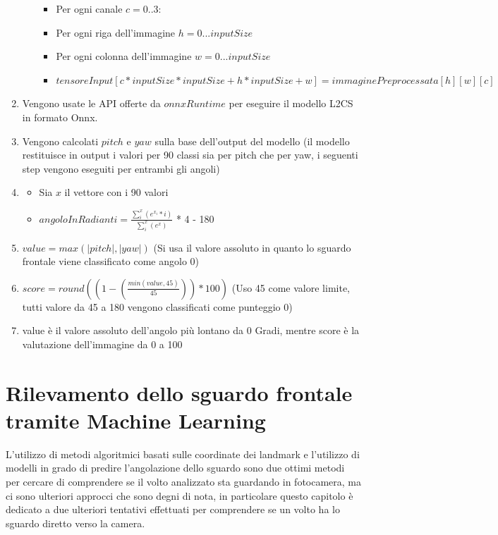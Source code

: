 \documentclass[12pt,a4paper,openright,twoside]{book}
\begin{document}
\begin{enumerate}
\begin{itemize}
\begin{itemize}
            \item Per ogni canale \(c = 0..3\): 
            \item Per ogni riga dell'immagine \(h = 0...inputSize\) 
            \item Per ogni colonna dell'immagine \(w = 0...inputSize\) 
            \item \(tensoreInput[c * inputSize * inputSize + h * inputSize + w] = immaginePreprocessata[h][w][c]\)
        \end{itemize}
    \end{itemize}
    \item Vengono usate le API offerte da \(onnxRuntime\) per eseguire il modello L2CS in formato Onnx. 
    \item Vengono calcolati \(pitch\) e \(yaw\) sulla base dell'output del modello (il modello restituisce in output i valori per 90 classi sia per pitch che per yaw, i seguenti step vengono eseguiti per entrambi gli angoli) 
    \item \begin{itemize} 
        \item Sia \(x\) il vettore con i 90 valori
        \item \(angoloInRadianti = \frac{\sum_{i}^{x} (e^{x_i}*i)}{\sum_i^{x}(e^x)}\) * 4 - 180
    \end{itemize}
    \item \( value = max(|pitch|, |yaw|) \) (Si usa il valore assoluto in quanto lo sguardo frontale viene classificato come angolo 0)
    \item \( score = round((1 - (\frac{min(value, 45)}{45}))*100) \) (Uso 45 come valore limite, tutti valore da 45 a 180 vengono classificati come punteggio 0)
    \item value è il valore assoluto dell'angolo più lontano da 0 Gradi, mentre score è la valutazione dell'immagine da 0 a 100
\end{enumerate}

\chapter{Rilevamento dello sguardo frontale tramite Machine Learning}
L'utilizzo di metodi algoritmici basati sulle coordinate dei landmark e l'utilizzo di modelli in grado di predire l'angolazione dello sguardo sono due ottimi metodi per cercare di comprendere se il volto analizzato sta guardando in fotocamera, ma ci sono ulteriori approcci che sono degni di nota, in particolare questo capitolo è dedicato a due ulteriori tentativi effettuati per comprendere se un volto ha lo sguardo diretto verso la camera.
\end{document}
